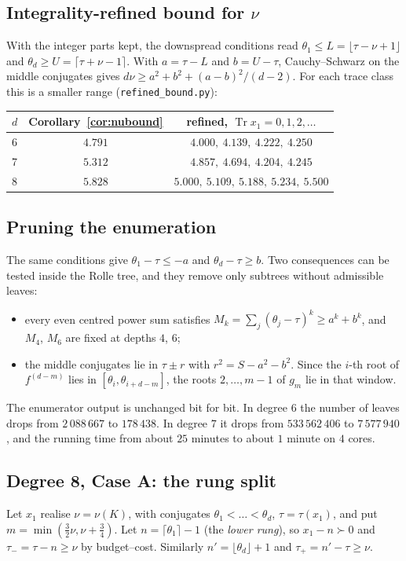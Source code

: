 \documentclass[11pt]{amsart}
\theoremstyle{definition}
\DeclareMathOperator{\Tr}{Tr}
\newcommand{\file}[1]{\texttt{#1}}
\begin{document}
\subsection{Integrality-refined bound for \texorpdfstring{$\nu$}{nu}}
With the integer parts kept, the downspread conditions read $\theta_1\le L=\lfloor\tau-\nu+1\rfloor$ and
$\theta_d\ge U=\lceil\tau+\nu-1\rceil$.  With $a=\tau-L$ and $b=U-\tau$, Cauchy--Schwarz on the
middle conjugates gives $d\nu\ge a^2+b^2+(a-b)^2/(d-2)$.  For each trace class this is a
smaller range (\file{refined\_bound.py}):
\begin{center}
\begin{tabular}{lcc}
\toprule
$d$ & Corollary~\ref{cor:nubound} & refined, $\Tr x_1=0,1,2,\dots$\\
\midrule
6 & $4.791$ & $4.000,\ 4.139,\ 4.222,\ 4.250$\\
7 & $5.312$ & $4.857,\ 4.694,\ 4.204,\ 4.245$\\
8 & $5.828$ & $5.000,\ 5.109,\ 5.188,\ 5.234,\ 5.500$\\
\bottomrule
\end{tabular}
\end{center}

\subsection{Pruning the enumeration}
The same conditions give $\theta_1-\tau\le-a$ and $\theta_d-\tau\ge b$.  Two consequences can be
tested inside the Rolle tree, and they remove only subtrees without admissible leaves:
\begin{itemize}[leftmargin=*]
\item every even centred power sum satisfies $M_k=\sum_j(\theta_j-\tau)^k\ge a^k+b^k$, and $M_4$,
  $M_6$ are fixed at depths $4$, $6$;
\item the middle conjugates lie in $\tau\pm r$ with $r^2=S-a^2-b^2$.  Since the $i$-th root of
  $f^{(d-m)}$ lies in $[\theta_i,\theta_{i+d-m}]$, the roots $2,\dots,m-1$ of $g_m$ lie in that
  window.
\end{itemize}
The enumerator output is unchanged bit for bit.  In degree $6$ the number of leaves drops
from $2\,088\,667$ to $178\,438$.  In degree $7$ it drops from $533\,562\,406$ to $7\,577\,940$,
and the running time from about $25$ minutes to about $1$ minute on $4$ cores.

\subsection{Degree 8, Case A: the rung split}\label{sec:d8A}
Let $x_1$ realise $\nu=\nu(K)$, with conjugates $\theta_1<\dots<\theta_d$, $\tau=\tau(x_1)$,
and put $m=\min(\frac32\nu,\nu+\frac34)$.  Let $n=\lceil\theta_1\rceil-1$ (the \emph{lower rung}),
so $x_1-n\succ0$ and $\tau_-=\tau-n\ge\nu$ by budget--cost.  Similarly
$n'=\lfloor\theta_d\rfloor+1$ and $\tau_+=n'-\tau\ge\nu$.
\end{document}
